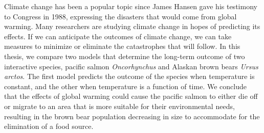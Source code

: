 Climate change has been a popular topic since James Hansen gave his testimony to Congress in 1988, expressing the disasters that would come from global warming.
Many researchers are studying climate change in hopes of predicting its effects.
If we can anticipate the outcomes of climate change, we can take measures to minimize or eliminate the catastrophes that will follow.
In this thesis, we compare two models that determine the long-term outcome of two interactive species, pacific salmon \emph{Oncorhynchus} and Alaskan brown bears \emph{Ursus arctos}.
The first model predicts the outcome of the species when temperature is constant, and the other when temperature is a function of time.
We conclude that the effects of global warming could cause the pacific salmon to either die off or migrate to an area that is more suitable for their environmental needs, resulting in the brown bear population decreasing in size to accommodate for the elimination of a food source.